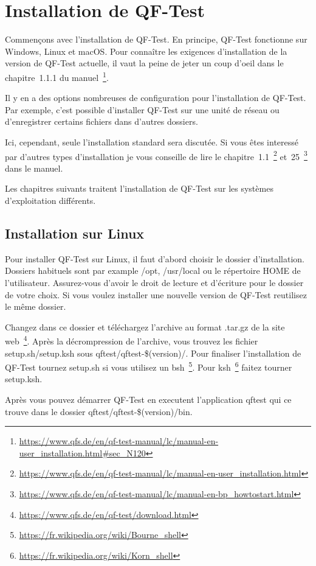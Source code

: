 \documentclass{article}
\begin{document}
\section{Installation de QF-Test}
\par{
Commençons avec l'installation de QF-Test. En principe, QF-Test fonctionne sur Windows, Linux et macOS.
Pour connaître les exigences d'installation de la version de QF-Test actuelle, il vaut la peine de jeter un
coup d'oeil dans le chapitre~1.1.1 du
manuel~\footnote{\url{https://www.qfs.de/en/qf-test-manual/lc/manual-en-user\_installation.html\#sec_N120}}.
}
\par{
Il y en a des options nombreuses de configuration pour l'installation de QF-Test. Par exemple, c'est
possible d'installer QF-Test sur une unité de réseau ou d'enregistrer certains fichiers dans d'autres
dossiers.
}
\par{
Ici, cependant, seule l'installation standard sera discutée. Si vous êtes interessé par d'autres types
d'installation je vous conseille de lire le
chapitre~1.1~\footnote{\url{https://www.qfs.de/en/qf-test-manual/lc/manual-en-user_installation.html}}
et~25~\footnote{\url{https://www.qfs.de/en/qf-test-manual/lc/manual-en-bp_howtostart.html}} dans le manuel.
\par{
Les chapitres suivants traitent l'installation de QF-Test sur les systèmes d'exploitation différents.
}

\subsection{Installation sur Linux}
\par{
Pour installer QF-Test sur Linux, il faut d'abord choisir le dossier d'installation. Dossiers habituels
sont par example /opt, /usr/local ou le répertoire HOME de l'utilisateur. Assurez-vous d'avoir le droit de
lecture et d'écriture pour le dossier de votre choix. Si vous voulez installer une nouvelle version de
QF-Test reutilisez le même dossier.
}
\par{
Changez dans ce dossier et téléchargez l'archive au format .tar.gz de la
site web~\footnote{\url{https://www.qfs.de/en/qf-test/download.html}}. Après la décrompression de
l'archive, vous trouvez les fichier setup.sh/setup.ksh sous qftest/qftest-\$(version)/. Pour finaliser
l'installation de QF-Test tournez setup.sh si vous utilisez un
bsh~\footnote{\url{https://fr.wikipedia.org/wiki/Bourne_shell}}. Pour
ksh~\footnote{\url{https://fr.wikipedia.org/wiki/Korn_shell}} faitez tourner setup.ksh.
}
\par{
Après vous pouvez démarrer QF-Test en executent l'application qftest qui ce trouve dans le dossier
qftest/qftest-\$(version)/bin.
}

}
\end{document}
